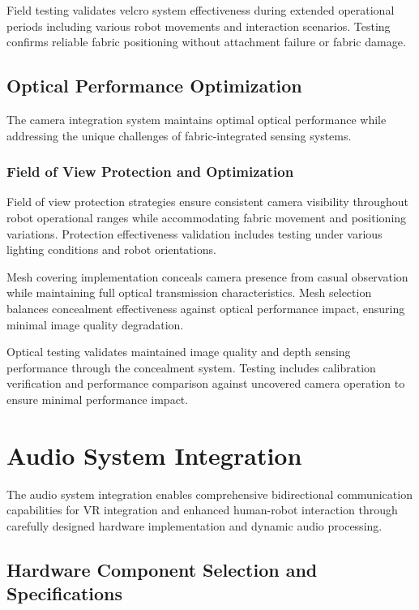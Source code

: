 Field testing validates velcro system effectiveness during extended operational periods including various robot movements and interaction scenarios. Testing confirms reliable fabric positioning without attachment failure or fabric damage.

\subsection{Optical Performance Optimization}

The camera integration system maintains optimal optical performance while addressing the unique challenges of fabric-integrated sensing systems.

\subsubsection{Field of View Protection and Optimization}

Field of view protection strategies ensure consistent camera visibility throughout robot operational ranges while accommodating fabric movement and positioning variations. Protection effectiveness validation includes testing under various lighting conditions and robot orientations.

Mesh covering implementation conceals camera presence from casual observation while maintaining full optical transmission characteristics. Mesh selection balances concealment effectiveness against optical performance impact, ensuring minimal image quality degradation.

Optical testing validates maintained image quality and depth sensing performance through the concealment system. Testing includes calibration verification and performance comparison against uncovered camera operation to ensure minimal performance impact.



\section{Audio System Integration}

The audio system integration enables comprehensive bidirectional communication capabilities for VR integration and enhanced human-robot interaction through carefully designed hardware implementation and dynamic audio processing.

\subsection{Hardware Component Selection and Specifications}

